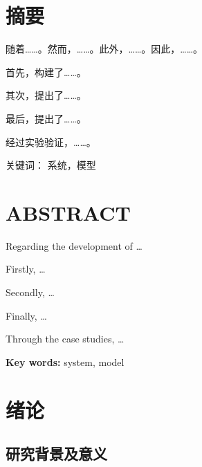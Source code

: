 \documentclass{HDU-Master-Thesis}
\begin{document}
\pagestyle{empty}




\cleardoublepage
\pagestyle{HDU-bachelor}


{}
\section*{摘\hspace{2em}要}

随着……。然而，……。此外，……。因此，……。

首先，构建了……。

其次，提出了……。

最后，提出了……。

经过实验验证，……。

\vspace{\baselineskip}\noindent
\textsf{关键词：} 系统，模型

\clearpage
{}
{}
\section*{\textbf{ABSTRACT}}

Regarding the development of \dots

Firstly, \dots
  
Secondly, \dots
  
Finally, \dots

Through the case studies, \dots

\vspace{\baselineskip}\noindent
\textbf{Key words:} system, model

\clearpage
\tableofcontents

\clearpage

\section{绪论}

\subsection{研究背景及意义}
\end{document}
